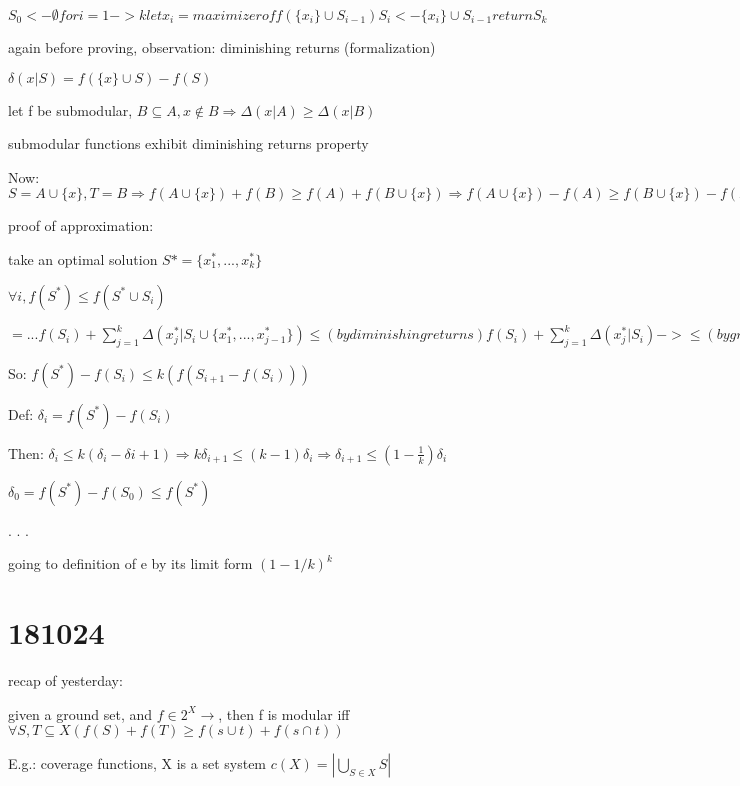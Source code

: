 \documentclass{report}
\begin{document}
	$
	S_0 <- \emptyset
	for i=1 -> k
		let x_i = maximizer of f(\{x_i\} \cup S_{i-1})
		S_i <- \{x_i\} \cup S_{i-1}		
	return S_k
	$
	
	again before proving, observation: diminishing returns (formalization)
	
	$\delta(x|S) = f(\{x\}\cup S) - f(S)$ %
	
	let f be submodular, $B \subseteq A, x \notin B \Rightarrow \Delta(x|A) \geq \Delta(x|B)$ %
	
	submodular functions exhibit diminishing returns property
	
	Now: $S=A\cup\{x\}, T=B \Rightarrow f(A\cup\{x\})+f(B)\geq f(A)+f(B\cup\{x\}) \Rightarrow f(A\cup\{x\})-f(A)\geq f(B\cup\{x\})-f(B) \Rightarrow \Delta(x|A) \geq \Delta(x|B)$
	
	proof of approximation:
	
	take an optimal solution $S*=\{x_1^*, ..., x_k^*\}$
	
	$\forall i, f(S^*) \leq f(S^* \cup S_i)$ %
	
	$ = ... f(S_i) + \sum_{j=1}^{k}\Delta(x_j^*|S_i\cup \{x_1^*, ..., x_{j-1}^*\}) \leq (bydiminishingreturns) f(S_i) + \sum_{j=1}^{k}\Delta(x_j^*|S_i) -> \leq (bygreediness) f(S_i) + \sum_{j=1}^{k}\Delta(x_{i+1}|S_i) = f(S_i) + k(f(S_i \cup \{x_{i+1}\})-f(S_i)) = kf(S_{i+1}) - (k-1)f(S_i)$
	
	
	So: $f(S^*) - f(S_i) \leq k(f(S_{i+1} - f(S_i)))$
	
	Def: $\delta_i = f(S^*) - f(S_i)$
	
	Then: $\delta_i \leq k(\delta_i - \delta{i+1}) \Rightarrow k\delta_{i+1} \leq (k-1)\delta_i \Rightarrow \delta_{i+1} \leq (1-\frac{1}{k})\delta_i$
	
	$\delta_0 = f(S^*)-f(S_0) \leq f(S^*)$ %
	
	
	.
	.
	.
	
	going to definition of e by its limit form $(1-1/k)^k$
	
	
	\section{181024}
	
	recap of yesterday:
	
	given a ground set, and $f \in 2^X \to \mathbb{}$, then f is modular iff $\forall S, T \subseteq X (f(S)+f(T) \geq f(s\cup t) + f(s \cap t))$
	
	E.g.: coverage functions, X is a set system $c(X) = \left| \bigcup_{S \in X} S \right|$
\end{document}
